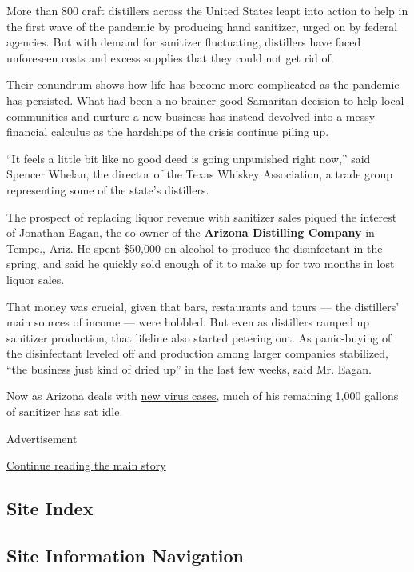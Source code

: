More than 800 craft distillers across the United States leapt into
action to help in the first wave of the pandemic by producing hand
sanitizer, urged on by federal agencies. But with demand for sanitizer
fluctuating, distillers have faced unforeseen costs and excess supplies
that they could not get rid of.

Their conundrum shows how life has become more complicated as the
pandemic has persisted. What had been a no-brainer good Samaritan
decision to help local communities and nurture a new business has
instead devolved into a messy financial calculus as the hardships of the
crisis continue piling up.

``It feels a little bit like no good deed is going unpunished right
now,'' said Spencer Whelan, the director of the Texas Whiskey
Association, a trade group representing some of the state's distillers.

The prospect of replacing liquor revenue with sanitizer sales piqued the
interest of Jonathan Eagan, the co-owner of the
\textbf{\href{https://azdistilling.com/}{Arizona Distilling Company}} in
Tempe., Ariz. He spent \$50,000 on alcohol to produce the disinfectant
in the spring, and said he quickly sold enough of it to make up for two
months in lost liquor sales.

That money was crucial, given that bars, restaurants and tours --- the
distillers' main sources of income --- were hobbled. But even as
distillers ramped up sanitizer production, that lifeline also started
petering out. As panic-buying of the disinfectant leveled off and
production among larger companies stabilized, ``the business just kind
of dried up'' in the last few weeks, said Mr. Eagan.

Now as Arizona deals with
\href{https://www.nytimes3xbfgragh.onion/interactive/2020/07/09/us/coronavirus-cases-reopening-trends.html}{new
virus cases}, much of his remaining 1,000 gallons of sanitizer has sat
idle.

Advertisement

\protect\hyperlink{after-bottom}{Continue reading the main story}

\hypertarget{site-index}{%
\subsection{Site Index}\label{site-index}}

\hypertarget{site-information-navigation}{%
\subsection{Site Information
Navigation}\label{site-information-navigation}}


